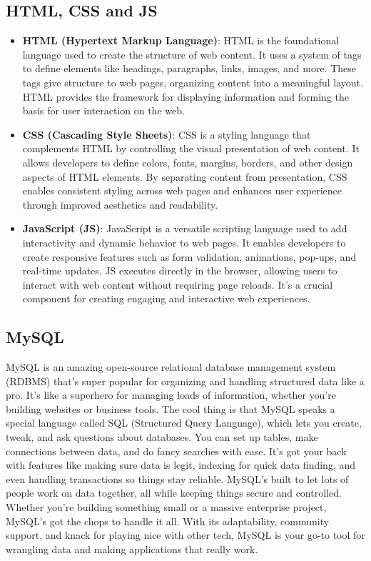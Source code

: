 \subsection{HTML, CSS and JS}
\begin{itemize}
    \item \textbf{HTML (Hypertext Markup Language)}: HTML is the foundational language used to create the structure of web content. It uses a system of tags to define elements like headings, paragraphs, links, images, and more. These tags give structure to web pages, organizing content into a meaningful layout. HTML provides the framework for displaying information and forming the basis for user interaction on the web.

    \item \textbf{CSS (Cascading Style Sheets)}: CSS is a styling language that complements HTML by controlling the visual presentation of web content. It allows developers to define colors, fonts, margins, borders, and other design aspects of HTML elements. By separating content from presentation, CSS enables consistent styling across web pages and enhances user experience through improved aesthetics and readability.

    \item \textbf{JavaScript (JS)}: JavaScript is a versatile scripting language used to add interactivity and dynamic behavior to web pages. It enables developers to create responsive features such as form validation, animations, pop-ups, and real-time updates. JS executes directly in the browser, allowing users to interact with web content without requiring page reloads. It's a crucial component for creating engaging and interactive web experiences.

\end{itemize}
\subsection{MySQL}
MySQL is an amazing open-source relational database management system (RDBMS) that's super popular for organizing and handling structured data like a pro. It's like a superhero for managing loads of information, whether you're building websites or business tools. The cool thing is that MySQL speaks a special language called SQL (Structured Query Language), which lets you create, tweak, and ask questions about databases. You can set up tables, make connections between data, and do fancy searches with ease. It's got your back with features like making sure data is legit, indexing for quick data finding, and even handling transactions so things stay reliable. MySQL's built to let lots of people work on data together, all while keeping things secure and controlled. Whether you're building something small or a massive enterprise project, MySQL's got the chops to handle it all. With its adaptability, community support, and knack for playing nice with other tech, MySQL is your go-to tool for wrangling data and making applications that really work.
